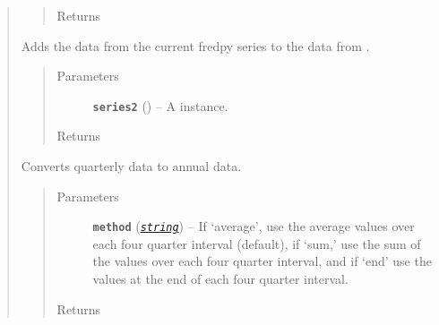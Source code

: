 \documentclass[letterpaper,10pt,openany,oneside]{sphinxmanual}
\begin{document}
\begin{fulllineitems}
\begin{quote}
\begin{fulllineitems}
\begin{quote}
\begin{description}
\item[{Returns}] \leavevmode
{\hyperref[series_class:fredpy.series]{}}

\end{description}\end{quote}

\end{fulllineitems}


\begin{fulllineitems}
\label{series_class:fredpy.series.plus}
Adds the data from the current fredpy series to the data from .
\begin{quote}\begin{description}
\item[{Parameters}] \leavevmode
\textbf{\texttt{series2}} ({\hyperref[series_class:fredpy.series]{}}) -- A  instance.

\item[{Returns}] \leavevmode
{\hyperref[series_class:fredpy.series]{}}

\end{description}\end{quote}

\end{fulllineitems}


\begin{fulllineitems}
\label{series_class:fredpy.series.quartertoannual}
Converts quarterly data to annual data.
\begin{quote}\begin{description}
\item[{Parameters}] \leavevmode
\textbf{\texttt{method}} (\href{https://docs.python.org/library/string.html\#module-string}{\emph{\texttt{string}}}) -- If `average', use the average values over each four quarter interval (default), if `sum,' use the sum of the values over each four quarter interval, and if `end' use the values at the end of each four quarter interval.

\item[{Returns}] \leavevmode
{\hyperref[series_class:fredpy.series]{}}


\end{description}
\end{quote}
\end{fulllineitems}
\end{quote}
\end{fulllineitems}
\end{document}
